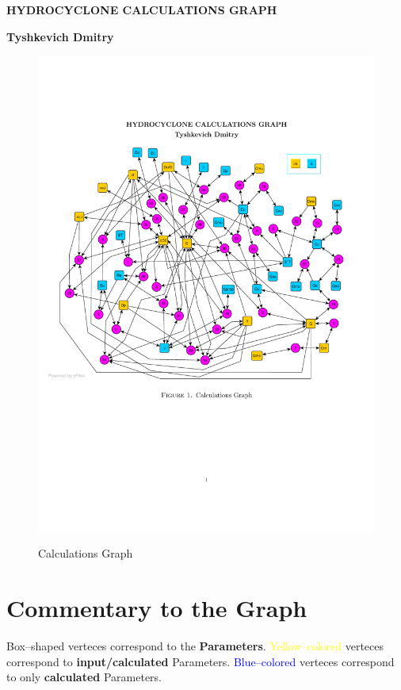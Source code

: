 \documentclass[12pt,reqno,intlimits,twoside]{amsart}
\renewcommand{\author}[1]{\begin{center}
{\bfseries{#1}}
\end{center}}
\renewcommand{\title}[1]{
\begin{center}
{\bfseries{#1}}
\end{center}}
\begin{document}
\title{HYDROCYCLONE CALCULATIONS GRAPH}

\author{Tyshkevich Dmitry}

\begin{figure}[!h]
  \includegraphics{CalculationGraphHydroCyclone}\\
  \caption{Calculations Graph}\label{FigCalcGraphHydro}
\end{figure}

\newpage

\section{Commentary to the Graph}

Box--shaped verteces correspond to the \textbf{Parameters}. \textcolor{yellow}{Yellow--colored} verteces correspond to
\textbf{input/calculated}  Parameters. \textcolor{blue}{Blue--colored} verteces correspond to only \textbf{calculated} Parameters.
\end{document}
